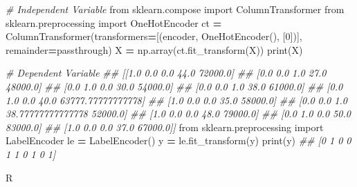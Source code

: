 \documentclass[
]{book}
\newenvironment{Shaded}{\begin{snugshade}}{\end{snugshade}}
\newcommand{\AttributeTok}[1]{\textcolor[rgb]{0.77,0.63,0.00}{#1}}
\newcommand{\BuiltInTok}[1]{#1}
\newcommand{\CommentTok}[1]{\textcolor[rgb]{0.56,0.35,0.01}{\textit{#1}}}
\newcommand{\DecValTok}[1]{\textcolor[rgb]{0.00,0.00,0.81}{#1}}
\newcommand{\FunctionTok}[1]{\textcolor[rgb]{0.00,0.00,0.00}{#1}}
\newcommand{\ImportTok}[1]{#1}
\newcommand{\NormalTok}[1]{#1}
\newcommand{\OperatorTok}[1]{\textcolor[rgb]{0.81,0.36,0.00}{\textbf{#1}}}
\newcommand{\OtherTok}[1]{\textcolor[rgb]{0.56,0.35,0.01}{#1}}
\newcommand{\SpecialCharTok}[1]{\textcolor[rgb]{0.00,0.00,0.00}{#1}}
\newcommand{\StringTok}[1]{\textcolor[rgb]{0.31,0.60,0.02}{#1}}
\theoremstyle{definition}
\theoremstyle{definition}
\theoremstyle{definition}
\theoremstyle{definition}
\theoremstyle{remark}
\begin{document}
\begin{Shaded}
\begin{Highlighting}[]
\CommentTok{\# Independent Variable}
\ImportTok{from}\NormalTok{ sklearn.compose }\ImportTok{import}\NormalTok{ ColumnTransformer}
\ImportTok{from}\NormalTok{ sklearn.preprocessing }\ImportTok{import}\NormalTok{ OneHotEncoder}
\NormalTok{ct }\OperatorTok{=}\NormalTok{ ColumnTransformer(transformers}\OperatorTok{=}\NormalTok{[(}\StringTok{\textquotesingle{}encoder\textquotesingle{}}\NormalTok{, OneHotEncoder(), [}\DecValTok{0}\NormalTok{])], remainder}\OperatorTok{=}\StringTok{\textquotesingle{}passthrough\textquotesingle{}}\NormalTok{)}
\NormalTok{X }\OperatorTok{=}\NormalTok{ np.array(ct.fit\_transform(X))}
\BuiltInTok{print}\NormalTok{(X)}

\CommentTok{\# Dependent Variable}
\CommentTok{\#\# [[1.0 0.0 0.0 44.0 72000.0]}
\CommentTok{\#\#  [0.0 0.0 1.0 27.0 48000.0]}
\CommentTok{\#\#  [0.0 1.0 0.0 30.0 54000.0]}
\CommentTok{\#\#  [0.0 0.0 1.0 38.0 61000.0]}
\CommentTok{\#\#  [0.0 1.0 0.0 40.0 63777.77777777778]}
\CommentTok{\#\#  [1.0 0.0 0.0 35.0 58000.0]}
\CommentTok{\#\#  [0.0 0.0 1.0 38.77777777777778 52000.0]}
\CommentTok{\#\#  [1.0 0.0 0.0 48.0 79000.0]}
\CommentTok{\#\#  [0.0 1.0 0.0 50.0 83000.0]}
\CommentTok{\#\#  [1.0 0.0 0.0 37.0 67000.0]]}
\ImportTok{from}\NormalTok{ sklearn.preprocessing }\ImportTok{import}\NormalTok{ LabelEncoder}
\NormalTok{le }\OperatorTok{=}\NormalTok{ LabelEncoder()}
\NormalTok{y }\OperatorTok{=}\NormalTok{ le.fit\_transform(y)}
\BuiltInTok{print}\NormalTok{(y)}
\CommentTok{\#\# [0 1 0 0 1 1 0 1 0 1]}
\end{Highlighting}
\end{Shaded}

R

\begin{Shaded}
\end{Shaded}
\end{document}
